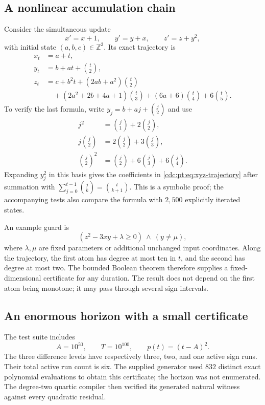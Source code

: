 \documentclass[11pt,a4paper]{article}
\theoremstyle{definition}
\theoremstyle{remark}
\newcommand{\Z}{\mathbb Z}
\begin{document}
\subsection{A nonlinear accumulation chain}
Consider the simultaneous update
\begin{equation}
 x'=x+1,\qquad y'=y+x,\qquad z'=z+y^2,
 \label{cdc:pt:eq:example-loop}
\end{equation}
with initial state $(a,b,c)\in\Z^3$. Its exact trajectory is
\begin{align}
 x_t&=a+t,\nonumber\\
 y_t&=b+at+\binom t2,\label{cdc:pt:eq:xyz-trajectory}\\
 z_t&=c+b^2t+(2ab+a^2)\binom t2\nonumber\\
 &\quad +(2a^2+2b+4a+1)\binom t3
 +(6a+6)\binom t4+6\binom t5.\nonumber
\end{align}
To verify the last formula, write $y_j=b+aj+\binom j2$ and use
\begin{align*}
 j^2&=\binom j1+2\binom j2,\\
 j\binom j2&=2\binom j2+3\binom j3,\\
 \binom j2^2&=\binom j2+6\binom j3+6\binom j4.
\end{align*}
Expanding $y_j^2$ in this basis gives the coefficients in
\eqref{cdc:pt:eq:xyz-trajectory} after summation with
$\sum_{j=0}^{t-1}\binom jk=\binom t{k+1}$. This is a symbolic proof;
the accompanying tests also compare the formula with $2{,}500$ explicitly
iterated states.

An example guard is
\[
 (z^2-3xy+\lambda\geq0)\ \wedge\ (y\neq\mu),
\]
where $\lambda,\mu$ are fixed parameters or additional unchanged input
coordinates. Along the trajectory, the first atom has degree at most ten
in $t$, and the second has degree at most two. The bounded Boolean theorem
therefore supplies a fixed-dimensional certificate for any duration. The
result does not depend on the first atom being monotone; it may pass
through several sign intervals.

\subsection{An enormous horizon with a small certificate}
The test suite includes
\[
 A=10^{50},\qquad T=10^{100},\qquad p(t)=(t-A)^2.
\]
The three difference levels have respectively three, two, and one active
sign runs. Their total active run count is six. The supplied generator
used $832$ distinct exact polynomial evaluations to obtain this
certificate; the horizon was not enumerated. The degree-two quartic
compiler then verified its generated natural witness against every
quadratic residual.
\end{document}

